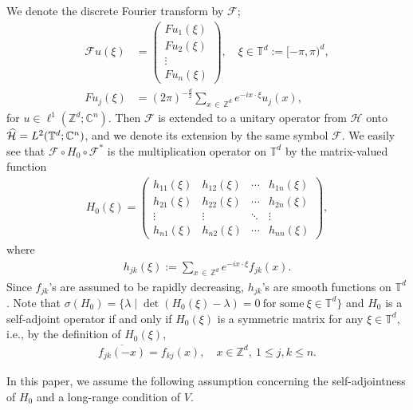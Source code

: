 \documentclass[AHL,Unicode,longabstracts,published]{cedram}
\newcommand{\x}{\xi}
\newcommand{\C}{\mathbb{C}}
\newcommand{\Z}{\mathbb{Z}}
\newcommand{\T}{\mathbb{T}}
\newcommand{\HS}{\mathcal{H}}
\newcommand{\FS}{\mathcal{F}}
\let\oldhat\hat
\renewcommand*{\hat}[1]{\mathchoice{\widehat{#1}}{\widehat{#1}}{\oldhat{#1}}{\oldhat{#1}}}
\newcommand{\Z}{\mathbb{Z}}
\newcommand{\HS}{\mathcal{H}}
\begin{document}
We denote the discrete Fourier transform by $\FS$;
\begin{align*}
\FS u(\xi) &=
\begin{pmatrix}
Fu_1(\xi) \\
Fu_2(\xi) \\
\vdots \\
Fu_n(\xi)
\end{pmatrix}, \quad \xi \in \T^d:=[-\pi,\pi)^d, \\
F u_j(\x) &= (2\pi)^{-\frac{d}{2}}\sum_{x\,\in\,\Z^d}e^{-ix\cdot\x}u_j(x),
\end{align*}
for $u\in \ell^1(\Z^d;\C^n)$. Then $\FS$ is extended to a unitary operator from $\HS$ onto $\hat{\HS}=L^2(\T^d; \C^n)$, and we denote its extension by the same symbol $\FS$. We easily see that $\FS \circ H_0 \circ \FS^*$ is the multiplication operator on $\T^d$ by the matrix-valued function
\begin{align*}
H_0(\xi) = 
\begin{pmatrix}
h_{11}(\xi) & h_{12}(\xi) & \cdots & h_{1n}(\xi) \\
h_{21}(\xi) & h_{22}(\xi) & \cdots & h_{2n}(\xi) \\
\vdots & \vdots & \ddots & \vdots \\
h_{n1}(\xi) & h_{n2}(\xi) & \cdots & h_{nn}(\xi)
\end{pmatrix},
\end{align*}
where
\begin{align*}
h_{jk}(\xi):=\sum_{x\,\in\,\Z^d}e^{-ix\cdot\xi}f_{jk}(x).
\end{align*}
Since $f_{jk}$'s are assumed to be rapidly decreasing, $h_{jk}$'s are smooth functions on $\T^d$. Note that $\sigma(H_0) = \{ \lambda \mid \det (H_0(\xi)-\lambda) =0 \ \text{for some}\ \xi \in \T^d \} $ and $H_0$ is a self-adjoint operator if and only if $H_0(\x)$ is a symmetric matrix for any $\x\in\T^d$, i.e., by the definition of $H_0(\x)$,
\begin{align}\label{selfadj}
\overline{f_{jk}(-x)}=f_{kj}(x), \quad x \in \Z^d, \ 1 \leq j,k \leq n.
\end{align}


In this paper, we assume the following assumption concerning the self-adjointness of $H_0$ and a long-range condition of $V$.
\end{document}
